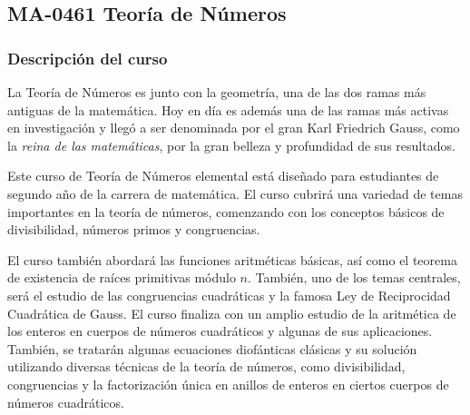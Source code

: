 \newpage
\subsection*{MA-0461 Teoría de Números}

\begin{refsection}
\begin{table}[H]
\end{table}



\subsubsection*{Descripción del curso}

La Teoría de Números es junto con la geometría, una de las dos ramas más antiguas de la matemática. Hoy en día es además una de las ramas más activas en investigación y llegó a ser denominada por el gran Karl Friedrich Gauss, como la \textit{reina de las matemáticas}, por la gran belleza y profundidad de sus resultados.

Este curso de Teoría de Números elemental está diseñado para estudiantes de segundo año de la carrera de matemática. El curso cubrirá una variedad de temas importantes en la teoría de números, comenzando con los conceptos básicos de divisibilidad, números primos y congruencias.

El curso también abordará las funciones aritméticas básicas, así como el teorema de existencia de raíces primitivas módulo $n$. También, uno de los temas centrales, será el estudio de las congruencias cuadráticas y la famosa Ley de Reciprocidad Cuadrática de Gauss. El curso finaliza con un amplio estudio de la aritmética de los enteros en cuerpos de números cuadráticos y algunas de sus aplicaciones. También, se tratarán algunas ecuaciones diofánticas clásicas y su solución utilizando diversas técnicas de la teoría de números, como divisibilidad, congruencias y la factorización única en anillos de enteros en ciertos cuerpos de números cuadráticos.


\end{refsection}
